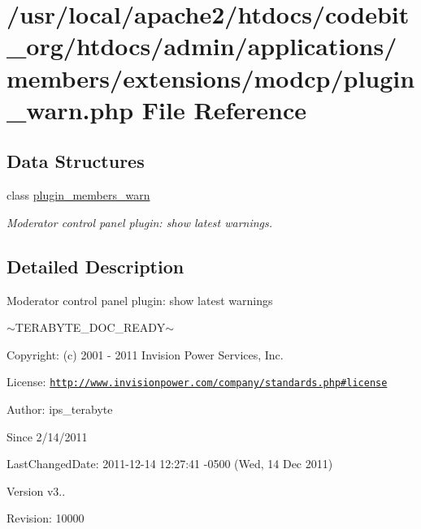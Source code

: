 \hypertarget{plugin__warn_8php}{\section{/usr/local/apache2/htdocs/codebit\-\_\-org/htdocs/admin/applications/members/extensions/modcp/plugin\-\_\-warn.php File Reference}
\label{plugin__warn_8php}
}
\subsection*{Data Structures}
\begin{DoxyCompactItemize}
\item 
class \hyperlink{classplugin__members__warn}{plugin\-\_\-members\-\_\-warn}
\begin{DoxyCompactList}\small\item\em Moderator control panel plugin\-: show latest warnings. \end{DoxyCompactList}\end{DoxyCompactItemize}


\subsection{Detailed Description}
\begin{DoxyVerb}  Moderator control panel plugin: show latest warnings
\end{DoxyVerb}
 $\sim$\-T\-E\-R\-A\-B\-Y\-T\-E\-\_\-\-D\-O\-C\-\_\-\-R\-E\-A\-D\-Y$\sim$ \begin{DoxyParagraph}{Copyright\-:}
(c) 2001 -\/ 2011 Invision Power Services, Inc.
\end{DoxyParagraph}
\begin{DoxyParagraph}{License\-:}
\href{http://www.invisionpower.com/company/standards.php#license}{\tt http\-://www.\-invisionpower.\-com/company/standards.\-php\#license}
\end{DoxyParagraph}
\begin{DoxyParagraph}{Author\-:}
ips\-\_\-terabyte 
\end{DoxyParagraph}
\begin{DoxySince}{Since}
2/14/2011 
\end{DoxySince}
\begin{DoxyParagraph}{Last\-Changed\-Date\-:}
2011-\/12-\/14 12\-:27\-:41 -\/0500 (Wed, 14 Dec 2011) 
\end{DoxyParagraph}
\begin{DoxyVersion}{Version}
v3.. 
\end{DoxyVersion}
\begin{DoxyParagraph}{Revision\-:}
10000 
\end{DoxyParagraph}
